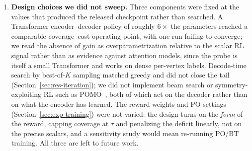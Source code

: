 \documentclass[11pt]{article}
\begin{document}
\begin{enumerate}
One replication run shows how much variance the recipe carries, and why the within-run criterion matters. Policy seed $22$ collapsed onto over-guarding: its greedy decode reaches an estimated coverage of $1.000$ while selecting almost every vertex, $|S|/n$ staying above $0.92$ from the second epoch until the run early-stopped at epoch $41$. That endpoint scores $-0.008$ under Eq.~\eqref{eq:reward}, against $+0.736$ and $+0.737$ for the two seeds that trained normally, so it failed to find a good optimum rather than gaming the reward. It is also the failure a raw-coverage checkpoint rule cannot see: coverage alone peaks at epoch $8$, covering everything with $96\%$ of the vertices, whereas subtracting the guard fraction (Section~\ref{sec:exp-training}) rejects that point. The same policy floods guards at evaluation on \texttt{ood-large}, which is why that cell is excluded from the encoder comparison (Section~\ref{sec:res-policy-seeds}).
  \item \textbf{Design choices we did not sweep.} Three components were fixed at the values that produced the released checkpoint rather than searched. A Transformer encoder--decoder policy of roughly $6\times$ the parameters reached a comparable coverage--cost operating point, with one run failing to converge; we read the absence of gain as overparametrization relative to the scalar RL signal rather than as evidence against attention models, since the probe is itself a small Transformer and works on dense per-vertex labels. Decode-time search by best-of-$K$ sampling matched greedy and did not close the tail (Section~\ref{sec:res-iteration}); we did not implement beam search or symmetry-exploiting RL such as POMO~\cite{Kwon2020POMO}, both of which act on the decoder rather than on what the encoder has learned. The reward weights and PO settings (Section~\ref{sec:exp-training}) were not varied: the design turns on the \emph{form} of the reward, capping coverage at $\tau$ and penalizing the deficit linearly, not on the precise scalars, and a sensitivity study would mean re-running PO/BT training. All three are left to future work.

\end{enumerate}
\end{document}
